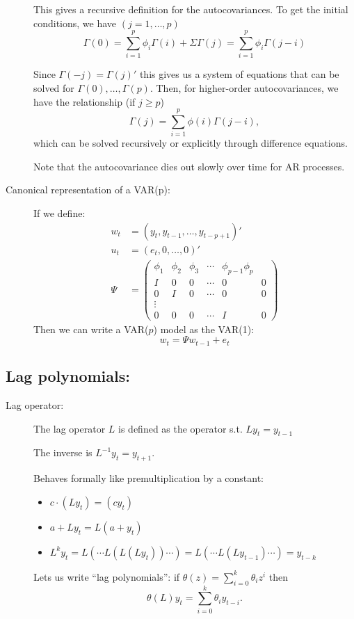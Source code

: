 \begin{description}
  This gives a recursive definition for the autocovariances. To get
  the initial conditions, we have $(j = 1,\dots,p)$
  \[\Gamma(0) = \sum_{i=1}^p \phi_i \Gamma(i) + \Sigma \Gamma(j) = \sum_{i=1}^p \phi_i \Gamma(j-i) \]

  Since $\Gamma(-j) = \Gamma(j)'$ this gives us a system of equations that can
  be solved for $\Gamma(0),\dots,\Gamma(p)$. Then, for higher-order autocovariances,
  we have the relationship (if $j \geq p$)
  \[\Gamma(j) = \sum_{i=1}^p \phi(i) \Gamma(j-i),\]
  which can be solved recursively or explicitly through difference
  equations.

  Note that the autocovariance dies out slowly over time for AR
  processes.
\item[Canonical representation of a VAR(p):]
If we define:
\begin{align}
  w_t &= (y_t, y_{t-1}, \dots, y_{t-p+1})' \\
  u_t &= (e_t, 0, \dots, 0)' \\
  \Psi &= \begin{pmatrix}
    \phi_1 & \phi_2 & \phi_3 & \cdots & \phi_{p-1} \phi_p \\
    I & 0 & 0 & \cdots & 0 & 0 \\
    0 & I & 0 & \cdots & 0 & 0 \\
    \vdots \\
    0 & 0 & 0 & \cdots & I & 0
  \end{pmatrix}
\end{align}
Then we can write a VAR($p$) model as the VAR(1):
\[w_t = \Psi w_{t-1} + e_t\]
\end{description}

\subsection{Lag polynomials:}

\begin{description}
\item[Lag operator:]

  The lag operator $L$ is defined as the operator s.t. $L y_t =
  y_{t-1}$

  The inverse is $L^{-1} y_t = y_{t+1}$.

  Behaves formally like premultiplication by a constant:
  \begin{itemize}
  \item $c \cdot (L y_t) = (c y_t)$
  \item $a + L y_t = L (a + y_t)$
  \item $L^k y_t = L(\cdots L(L(L y_t)) \cdots) = L(\cdots L(L y_{t-1}) \cdots) = y_{t-k}$
  \end{itemize}
  Lets us write ``lag polynomials'':
  if $\theta(z) = \sum_{i=0}^k \theta_i z^i$ then
  \[\theta(L) y_t = \sum_{i=0}^k \theta_i y_{t-i}.\]
\end{description}

